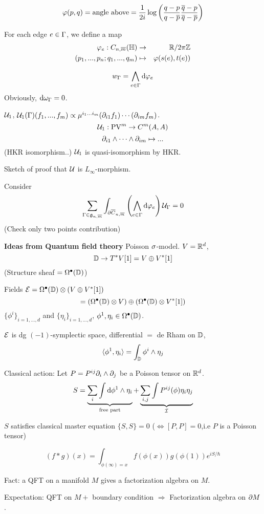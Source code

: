 $$\varphi(p,q)=\text{angle above}
=\frac{1}{2i}\log\left(\frac{q-p}{q-\overline{p}}
\frac{\overline{q}-p}{\overline{q}-\overline{p}}\right)$$

For each edge $e\in\Gamma$, we define a map
\begin{eqnarray*}
  \varphi_e:C_{n,\overline{m}}(\mathbb{H})&\to& \mathbb{R}/2\pi\mathbb{Z}\\
  (p_1,...,p_n;q_1,...,q_m)&\mapsto&\varphi(s(e),t(e))
\end{eqnarray*}

$$w_\Gamma=\bigwedge_{e\in\Gamma}\mathrm{d}\varphi_e$$
Obviously, $\mathrm{d}\omega_{\Gamma}=0$.

$\mathcal{U}_1$, $\mathcal{U}_1(\Gamma)(f_1,...,f_m)
\propto\mu^{i_1...i_m}(\partial_{i1}f_1)\cdots(\partial_{im}f_m)$.
$$\mathcal{U}_1:\operatorname{PV}^m\to C^m(A,A)$$
$$
  \partial_{i1}\wedge\cdots\wedge\partial_{im}\mapsto...
$$
(HKR isomorphism..) $\mathcal{U}_1$ is quasi-isomorphism by HKR.

Sketch of proof that $\mathcal{U}$ is $L_\infty$-morphism.

Consider
$$
  \sum_{\Gamma\in\mathfrak{g}_{n,\overline{m}}}
    \int_{\partial\overline{C}_{n,\overline{m}}}
      \left(
        \bigwedge_{e\in\Gamma}
          \mathrm{d}\varphi_e
      \right)
      \mathcal{U}_\Gamma
=0
$$
(Check only two points contribution)

\textbf{Ideas from Quantum field theory}
Poisson $\sigma$-model. $V=\mathbb{R}^d$,
$$\mathbb{D}\to T^*V[1]=V\oplus V^*[1]$$
(Structure sheaf $=\Omega^{\bullet}(\mathbb{D})$)

Fields $\mathcal{E}=\Omega^{\bullet}(\mathbb{D})\otimes(V\oplus V^*[1])$
$$=(\Omega^{\bullet}(\mathbb{D})\otimes V)\oplus(\Omega^{\bullet}(\mathbb{D})\otimes V^*[1])$$
$\{\phi^i\}_{i=1,...,d}$ and $\{\eta_i\}_{i=1,...,d}$,
$\phi^1,\eta_i\in\Omega^{\bullet}(\mathbb{D})$.

$\mathcal{E}$ is dg $(-1)$-symplectic space, differential $=$ de Rham on $\mathbb{D}$,
$$\langle \phi^1,\eta_i \rangle=\int_{\mathbb{D}}\phi^i\wedge\eta_j$$

Classical action: Let $P=P^{ij}\partial_i\wedge\partial_j$
be a Poisson tensor on $\mathbb{R}^d$.
$$S=\underbrace{\sum_i\int\mathrm{d}\phi^1\wedge\eta_i}_{\text{free part}}
+\underbrace{\sum_{i,j}\int P^{ij}(\phi)\eta_i\eta_j}_{\mathcal{I}}$$

$S$ satisfies classical master equation $\{S,S\}=0$
($\iff [P,P]=0$,i.e $P$ is a Poisson tensor)

$$
  (f*g)(x)
=
  \int_{\phi(\infty)=x}
    f(\phi(x))g(\phi(1))e^{iS/\hbar}
$$

Fact: a QFT on a manifold $M$ gives a factorization algebra on $M$.

Expectation: QFT on $M+$ boundary condition $\Rightarrow$
Factorization algebra on $\partial M$.

